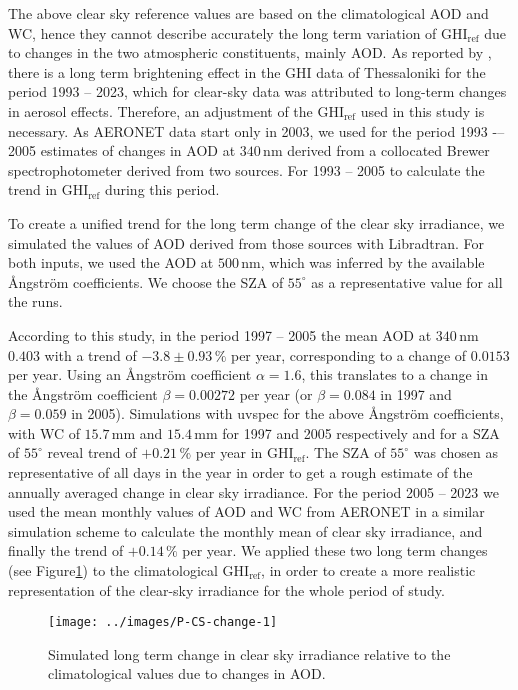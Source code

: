 \documentclass[preprint, 5p,
authoryear]{elsarticle} %
\begin{document}
The above clear sky reference values are based on the climatological AOD
and WC, hence they cannot describe accurately the long term variation of
\(\text{GHI}_\text{ref}\) due to changes in the two atmospheric
constituents, mainly AOD. As reported by \citet{Natsis2023}, there is a
long term brightening effect in the GHI data of Thessaloniki for the
period 1993 -- 2023, which for clear-sky data was attributed to
long-term changes in aerosol effects. Therefore, an adjustment of the
\(\text{GHI}_\text{ref}\) used in this study is necessary. As AERONET
data start only in 2003, we used for the period 1993 -\/-- 2005
estimates of changes in AOD at \(340\,\text{nm}\) derived from a
collocated Brewer spectrophotometer derived from two sources. For 1993
-- 2005 \citep{Kazadzis2007} to calculate the trend in
\(\text{GHI}_\text{ref}\) during this period.

To create a unified trend for the long term change of the clear sky
irradiance, we simulated the values of AOD derived from those sources
with Libradtran. For both inputs, we used the AOD at \(500\,\text{nm}\),
which was inferred by the available Ångström coefficients. We choose the
SZA of \(55^\circ\) as a representative value for all the runs.

According to this study, in the period 1997 -- 2005 the mean AOD at
\(340\,\text{nm}\) \(0.403\) with a trend of \(-3.8\pm0.93\,\%\) per
year, corresponding to a change of \(0.0153\) per year. Using an
Ångström coefficient \(\alpha = 1.6\), this translates to a change in
the Ångström coefficient \(\beta=0.00272\) per year (or \(\beta=0.084\)
in 1997 and \(\beta=0.059\) in 2005). Simulations with uvspec for the
above Ångström coefficients, with WC of \(15.7\,\text{mm}\) and
\(15.4\,\text{mm}\) for 1997 and 2005 respectively and for a SZA of
\(55^\circ\) reveal trend of \(+0.21\,\%\) per year in
\(\text{GHI}_\text{ref}\). The SZA of \(55^\circ\) was chosen as
representative of all days in the year in order to get a rough estimate
of the annually averaged change in clear sky irradiance. For the period
2005 -- 2023 we used the mean monthly values of AOD and WC from AERONET
in a similar simulation scheme to calculate the monthly mean of clear
sky irradiance, and finally the trend of \(+0.14\,\%\) per year. We
applied these two long term changes (see
Figure\nobreakspace{}\ref{fig:CS-change}) to the climatological
\(\text{GHI}_\text{ref}\), in order to create a more realistic
representation of the clear-sky irradiance for the whole period of
study.

\begin{figure}

{\centering \texttt{[image: ../images/P-CS-change-1]} 

}

\caption{Simulated long term change in clear sky irradiance relative to the climatological values due to changes in AOD.}\label{fig:CS-change}
\end{figure}
\end{document}
